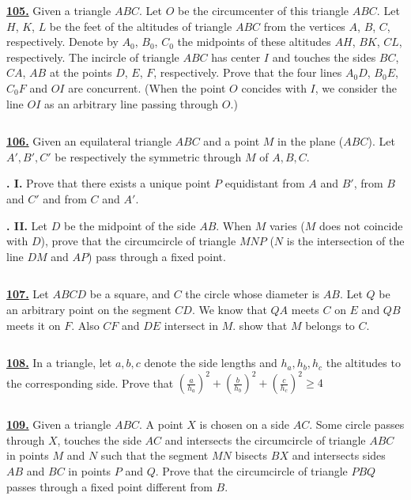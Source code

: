 \documentclass{article}
\begin{document}
$$ $$


\href{http://www.artofproblemsolving.com/Forum/viewtopic.php?p=268390#p268390
 }{\bf 105.} Given a triangle $ABC$. Let $O$ be the circumcenter of this triangle $ABC$. Let $H$, $K$, $L$ be the feet of the altitudes of triangle $ABC$ from the vertices $A$, $B$, $C$, respectively. Denote by $A_{0}$, $B_{0}$, $C_{0}$ the midpoints of these altitudes $AH$, $BK$, $CL$, respectively. The incircle of triangle $ABC$ has center $I$ and touches the sides $BC$, $CA$, $AB$ at the points $D$, $E$, $F$, respectively. Prove that the four lines $A_{0}D$, $B_{0}E$, $C_{0}F$ and $OI$ are concurrent. (When the point $O$ concides with $I$, we consider the line $OI$ as an arbitrary line passing through $O$.)


$$ $$


\href{http://www.artofproblemsolving.com/Forum/viewtopic.php?p=268044#p268044
 }{\bf 106.} Given an equilateral triangle $ABC$ and a point $M$ in the plane ($ABC$). Let $A', B', C'$ be respectively the symmetric through $M$ of $A, B, C$.

{\bf. I.} Prove that there exists a unique point $P$ equidistant from $A$ and $B'$, from $B$ and $C'$ and from $C$ and $A'$.

{\bf. II.}  Let $D$ be the midpoint of the side $AB$. When $M$ varies ($M$ does not coincide with $D$), prove that the circumcircle of triangle $MNP$ ($N$ is the intersection of the line $DM$ and $AP$) pass through a fixed point.


$$ $$


\href{ http://www.artofproblemsolving.com/Forum/viewtopic.php?p=220569#p220569
}{\bf 107.} Let $ABCD$ be a square, and $C$ the circle whose diameter is $AB.$ Let $Q$ be an arbitrary point on the segment $CD.$ We know that $QA$ meets $C$ on $E$ and $QB$ meets it on $F.$ Also $CF$ and $DE$ intersect in $M.$ show that $M$ belongs to $C.$


$$ $$


\href{ http://www.artofproblemsolving.com/Forum/viewtopic.php?p=278616#p278616
}{\bf 108.} In a triangle, let $a,b,c$ denote the side lengths and $h_a, h_b, h_c$ the altitudes to the corresponding side. Prove that $(\frac{a}{h_a})^2+(\frac{b}{h_b})^2+(\frac{c}{h_c})^2 \geq 4$


$$ $$


\href{http://www.artofproblemsolving.com/Forum/viewtopic.php?p=135082#p135082
 }{\bf 109.} Given a triangle $ABC$. A point $X$ is chosen on a side $AC$. Some circle passes through $X$, touches the side $AC$ and intersects the circumcircle of triangle $ABC$ in points $M$ and $N$ such that the segment $MN$ bisects $BX$ and intersects sides $AB$ and $BC$ in points $P$ and $Q$. Prove that the circumcircle of triangle $PBQ$ passes through a fixed point different from $B$.
\end{document}
